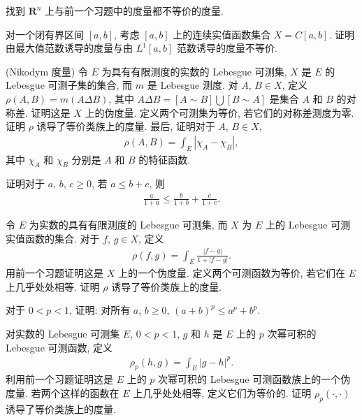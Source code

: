 \documentclass[../../main.tex]{subfiles}
\begin{document}
\begin{exercise}\label{exercise:ch09-03}
找到 $\mathbf{R}^{n}$ 上与前一个习题中的度量都不等价的度量.
\end{exercise}

\begin{exercise}\label{exercise:ch09-04}
对一个闭有界区间 $[a,b]$, 考虑 $[a,b]$ 上的连续实值函数集合 $X=C[a,b]$. 证明由最大值范数诱导的度量与由 $L^{1}[a,b]$ 范数诱导的度量不等价.
\end{exercise}

\begin{exercise}\label{exercise:ch09-05}
(Nikodym 度量) 令 $E$ 为具有有限测度的实数的 Lebesgue 可测集, $X$ 是 $E$ 的 Lebesgue 可测子集的集合, 而 $m$ 是 Lebesgue 测度. 对 $A$, $B\in X$, 定义 $\rho(A,B)=m(A\Delta B)$, 其中 $A\Delta B=[A\sim B]\bigcup[B\sim A]$ 是集合 $A$ 和 $B$ 的对称差. 证明这是 $X$ 上的伪度量. 定义两个可测集为等价, 若它们的对称差测度为零. 证明 $\rho$ 诱导了等价类族上的度量. 最后, 证明对于 $A$, $B\in X$,
\begin{align*}
\rho(A,B)=\int_{E}|\chi_{A}-\chi_{B}|,
\end{align*}
其中 $\chi_{A}$ 和 $\chi_{B}$ 分别是 $A$ 和 $B$ 的特征函数.
\end{exercise}

\begin{exercise}\label{exercise:ch09-06}
证明对于 $a$, $b$, $c\geqslant 0$, 若 $a\leqslant b+c$, 则
\begin{align*}
\frac{a}{1+a}\leqslant\frac{b}{1+b}+\frac{c}{1+c}.
\end{align*}
\end{exercise}

\begin{exercise}\label{exercise:ch09-07}
令 $E$ 为实数的具有有限测度的 Lebesgue 可测集, 而 $X$ 为 $E$ 上的 Lebesgue 可测实值函数的集合. 对于 $f$, $g\in X$, 定义
\begin{align*}
\rho(f,g)=\int_{E}\frac{|f-g|}{1+|f-g|}.
\end{align*}
用前一个习题证明这是 $X$ 上的一个伪度量. 定义两个可测函数为等价, 若它们在 $E$ 上几乎处处相等. 证明 $\rho$ 诱导了等价类族上的度量.
\end{exercise}

\begin{exercise}\label{exercise:ch09-08}
对于 $0<p<1$, 证明: 对所有 $a$, $b\geqslant 0$, $(a+b)^{p}\leqslant a^{p}+b^{p}$.
\end{exercise}

\begin{exercise}\label{exercise:ch09-09}
对实数的 Lebesgue 可测集 $E$, $0<p<1$, $g$ 和 $h$ 是 $E$ 上的 $p$ 次幂可积的 Lebesgue 可测函数, 定义
\begin{align*}
\rho_{p}(h,g)=\int_{E}|g-h|^{p}.
\end{align*}
利用前一个习题证明这是 $E$ 上的 $p$ 次幂可积的 Lebesgue 可测函数族上的一个伪度量. 若两个这样的函数在 $E$ 上几乎处处相等, 定义它们为等价的. 证明 $\rho_{p}(\cdot,\cdot)$ 诱导了等价类族上的度量.
\end{exercise}
\end{document}
